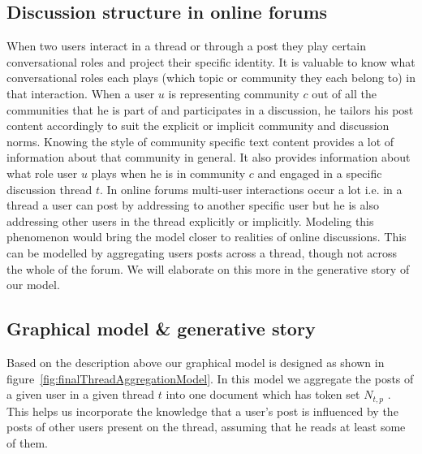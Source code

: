 \documentclass{sig-alternate}
\newcommand{\comment}[1]{\textcolor{red}{[#1]}}
\begin{document}
\subsection{Discussion structure in online forums}
When two users interact in a thread or through a post
they play certain conversational roles and project their specific identity.
It is valuable to know what conversational roles each plays (which topic or
community they each belong to) in that interaction. When a user $u$ is
representing community $c$ out of all the communities that he is part of and
participates in a discussion, he tailors his post content accordingly to suit
the explicit or implicit community and discussion norms. Knowing the style of
community specific text content provides a lot of information about that community 
in general. It also provides information about what role user $u$ plays when he
is in community $c$ and engaged in a specific discussion thread $t$. In online
forums multi-user interactions occur a lot i.e.
in a thread a user can post by addressing to another specific user but he is
also addressing other users in the thread explicitly or implicitly. Modeling
this phenomenon would bring the model closer to realities of online discussions.
This can be modelled by aggregating users posts across a thread,
though not across the whole of the forum. We will elaborate on this more in the
generative story of our model. 



\subsection{Graphical model \& generative story}
\label{sec:gen-story}
Based on the description above our graphical model is designed as shown
in figure~\ref{fig:finalThreadAggregationModel}. In this model
we aggregate the posts of 
a given user in a given thread $t$ into one document which has token
set $N_{t,p}$ . This helps us incorporate the knowledge that a user's post is
influenced by the posts of other users present on the thread, assuming that
he reads at least some of them.
\end{document}
